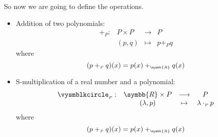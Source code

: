 So now we are going to define the operations.
\begin{itemize}
\item Addition of two polynomials:
  \[
    \begin{array}{lccc}
      +_{\scriptscriptstyle P}: & P\times P & \longrightarrow & P\\
         & (p,q) & \mapsto & p +_{\scriptscriptstyle P} q
    \end{array}
  \]
  where
  \[
    (p +_{\scriptscriptstyle P} q) (x) = p(x) +_{\scriptscriptstyle \symbb{R}} q(x)
  \]

  \item S-multiplication of a real number and a polynomial:
  \[
    \begin{array}{lccc}
      \vysmblkcircle_{\scriptscriptstyle P}: & \symbb{R}\times P & \longrightarrow & P\\
         & (\lambda,p) & \mapsto & \lambda \cdot_{\scriptscriptstyle P} p
    \end{array}
  \]
  where
  \[
    (p +_{\scriptscriptstyle P} q) (x) = p(x) +_{\scriptscriptstyle \symbb{R}} q(x)
  \]
\end{itemize}

